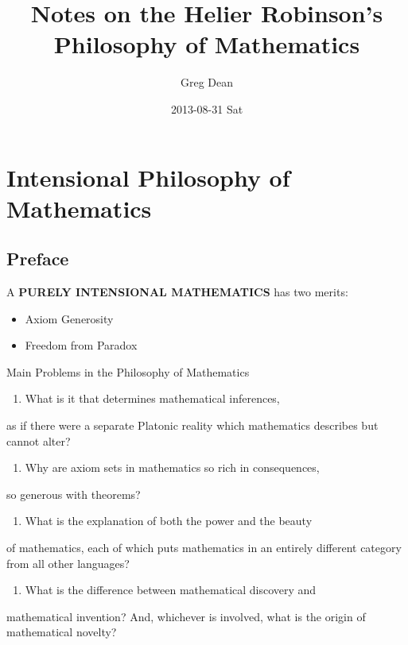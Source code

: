 \documentclass[11pt]{article}
\title{Notes on the Helier Robinson's Philosophy of Mathematics}
\author{Greg Dean}
\date{2013-08-31 Sat}
\begin{document}
\maketitle

\setcounter{tocdepth}{3}
\tableofcontents
\vspace*{1cm}

\section{Intensional Philosophy of Mathematics}
\label{sec-1}

\subsection{Preface}
\label{sec-1.1}

A \textbf{PURELY INTENSIONAL MATHEMATICS} has two merits:

\begin{itemize}
\item Axiom Generosity
\item Freedom from Paradox
\end{itemize}
Main Problems in the Philosophy of Mathematics

\begin{enumerate}
\item What is it that determines mathematical inferences,
\end{enumerate}
as if there were a separate Platonic reality which
mathematics describes but cannot alter?

\begin{enumerate}
\item Why are axiom sets in mathematics so rich in consequences,
\end{enumerate}
so generous with theorems?

\begin{enumerate}
\item What is the explanation of both the power and the beauty
\end{enumerate}
of mathematics, each of which puts mathematics in an entirely
different category from all other languages?

\begin{enumerate}
\item What is the difference between mathematical discovery and
\end{enumerate}
mathematical invention? And, whichever is involved, what is
the origin of mathematical novelty?
\end{document}
